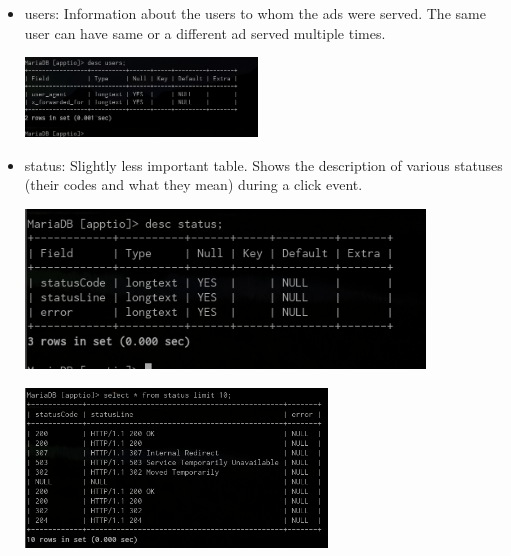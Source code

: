 \documentclass[11pt]{article}
\begin{document}
\begin{itemize}
\begin{itemize}
\item users: Information about the users to whom the ads were served. The same user can have same or a different ad served multiple times.

\begin{center}
\includegraphics[height=80]{imgs/users.png}
\end{center}

\item status: Slightly less important table. Shows the description of various statuses (their codes and what they mean) during a click event.

\begin{center}
\includegraphics[height=160]{imgs/status1.png}
\end{center}
\begin{center}
\includegraphics[height=160]{imgs/status2.png}
\end{center}
\end{itemize}


\end{itemize}
\end{document}
